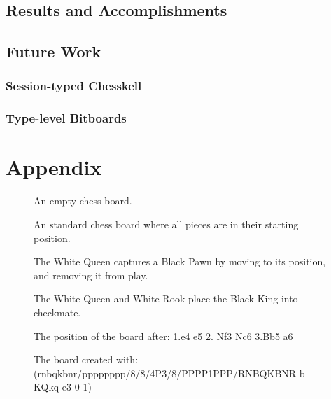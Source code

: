 \documentclass[12pt, a4paper, bibliography=totocnumbered]{scrreprt}
\begin{document}
\section{Results and Accomplishments}

\section{Future Work}

\subsection{Session-typed Chesskell}

\subsection{Type-level Bitboards}






\chapter{Appendix}

\begin{figure}
    \showboard
    \caption{An empty chess board.}
    \label{chessboard}
\end{figure}

\begin{figure}
    \newgame
    \showboard
    \caption{An standard chess board where all pieces are in their starting position.}
    \label{startboard}
\end{figure}

\begin{figure}
    \showboard
    \quad
    \showboard
    \caption{The White Queen captures a Black Pawn by moving to its position, and removing it from play.}
    \label{capture}
\end{figure}

\begin{figure}
    \showboard
    \caption{The White Queen and White Rook place the Black King into checkmate.}
    \label{checkmate}
\end{figure}

\begin{figure}
    \newgame
    \showboard
    \caption{The position of the board after: 1.e4 e5 2. Nf3 Nc6 3.Bb5 a6}
    \label{algebraicexample}
\end{figure}

\begin{figure}
    \showboard
    \caption{The board created with: (rnbqkbnr/pppppppp/8/8/4P3/8/PPPP1PPP/RNBQKBNR b KQkq e3 0 1)}
    \label{fenexample}
\end{figure}
\end{document}
